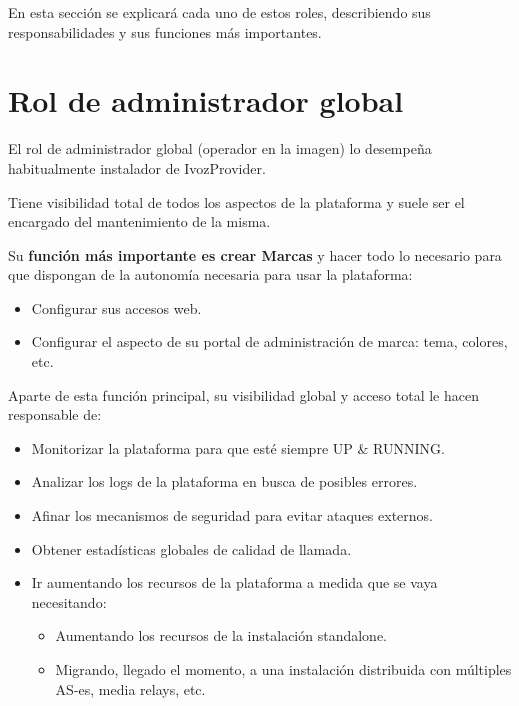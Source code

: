\documentclass[letterpaper,10pt,spanish]{sphinxmanual}
\begin{document}
\noindent{}

En esta sección se explicará cada uno de estos roles, describiendo sus responsabilidades y sus funciones más importantes.


\section{Rol de administrador global}
\label{operation_roles/index:rol-de-administrador-global}
El rol de administrador global (operador en la imagen) lo desempeña habitualmente instalador de IvozProvider.

Tiene visibilidad total de todos los aspectos de la plataforma y suele ser el encargado del mantenimiento de la misma.

Su \textbf{función más importante es crear Marcas} y hacer todo lo necesario para que dispongan de la autonomía necesaria para usar la plataforma:
\begin{itemize}
\item {} 
Configurar sus accesos web.

\item {} 
Configurar el aspecto de su portal de administración de marca: tema, colores, etc.

\end{itemize}

Aparte de esta función principal, su visibilidad global y acceso total le hacen responsable de:
\begin{itemize}
\item {} 
Monitorizar la plataforma para que esté siempre UP \& RUNNING.

\item {} 
Analizar los logs de la plataforma en busca de posibles errores.

\item {} 
Afinar los mecanismos de seguridad para evitar ataques externos.

\item {} 
Obtener estadísticas globales de calidad de llamada.

\item {} 
Ir aumentando los recursos de la plataforma a medida que se vaya necesitando:
\begin{itemize}
\item {} 
Aumentando los recursos de la instalación standalone.

\item {} 
Migrando, llegado el momento, a una instalación distribuida con múltiples AS-es, media relays, etc.

\end{itemize}

\end{itemize}
\end{document}
